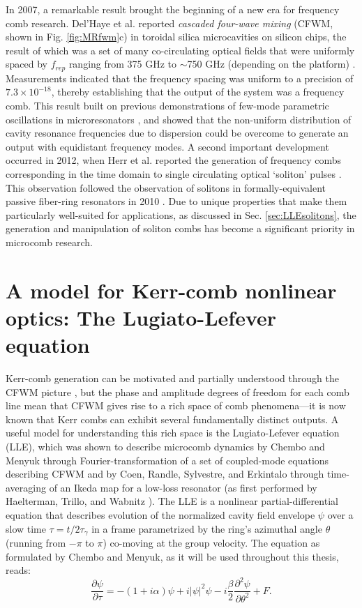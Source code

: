 In 2007, a remarkable result brought the beginning of a new era for frequency comb research. Del'Haye et al. reported \textit{cascaded four-wave mixing} (CFWM, shown in Fig. \ref{fig:MRfwm}c) in toroidal silica microcavities on silicon chips, the result of which was a set of many co-circulating optical fields that were uniformly spaced by $f_{rep}$ ranging from 375 GHz to $\sim$750 GHz (depending on the platform) \cite{DelHaye2007}. Measurements indicated that the frequency spacing was uniform to a precision of $7.3 \times 10^{-18}$, thereby establishing that the output of the system was a frequency comb. This result built on previous demonstrations of few-mode parametric oscillations in microresonators \cite{Kippenberg2004, Savchenkov2004,Agha2007}, and showed that the non-uniform distribution of cavity resonance frequencies due to dispersion could be overcome to generate an output with equidistant frequency modes. A second important development occurred in 2012, when Herr et al. reported the generation of frequency combs corresponding in the time domain to single circulating optical `soliton' pulses \cite{Herr2014wArxiv}. This observation followed the observation of solitons in formally-equivalent passive fiber-ring resonators in 2010 \cite{Leo2010a}. Due to unique properties that make them particularly well-suited for applications, as discussed in Sec. \ref{sec:LLEsolitons}, the generation and manipulation of soliton combs has become a significant priority in microcomb research. 

\section{A model for Kerr-comb nonlinear optics: The Lugiato-Lefever equation}

Kerr-comb generation can be motivated and partially understood through the CFWM picture \cite{Herr2012}, but the phase and amplitude degrees of freedom for each comb line mean that CFWM gives rise to a rich space of comb phenomena---it is now known that Kerr combs can exhibit several fundamentally distinct outputs.  A useful model for understanding this rich space is the Lugiato-Lefever equation (LLE), which was shown to describe microcomb dynamics by Chembo and Menyuk \cite{Chembo2013} through Fourier-transformation of a set of coupled-mode equations describing CFWM and by Coen, Randle, Sylvestre, and Erkintalo \cite{Coen2013a} through time-averaging of an Ikeda map for a low-loss resonator (as first performed by Haelterman, Trillo, and Wabnitz \cite{Haelterman1992a}).  The LLE is a nonlinear partial-differential equation that describes evolution of the normalized cavity field envelope $\psi$ over a slow time $\tau=t/2\tau_\gamma$ in a frame parametrized by the ring's azimuthal angle $\theta$ (running from $-\pi$ to $\pi$) co-moving at the group velocity. The equation as formulated by Chembo and Menyuk, as it will be used throughout this thesis, reads:
\begin{equation}
\frac{\partial \psi}{\partial \tau}=-(1+i \alpha) \psi + i|\psi|^2 \psi -i \frac{\beta}{2} \frac{\partial^2 \psi}{\partial \theta^2} +F. \label{eq:LLE}
\end{equation}

